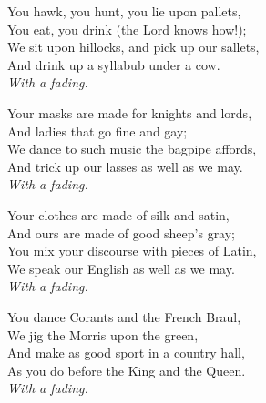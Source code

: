 \begin{dcverse}\footnotesize
\begin{patverse}
You hawk, you hunt, you lie upon pallets,\\
You eat, you drink (the Lord knows how!);\\
We sit upon hillocks, and pick up our sallets,\\
And drink up a syllabub under a cow.\\
\textit{With a fading.}
\end{patverse}

\begin{patverse}
Your masks are made for knights and lords,\\
And ladies that go fine and gay;\\
We dance to such music the bagpipe affords,\\
And trick up our lasses as well as we may.\\
\textit{With a fading.}
\end{patverse}

\begin{patverse}
Your clothes are made of silk and satin,\\
And ours are made of good sheep’s gray;\\
You mix your discourse with pieces of Latin,\\
We speak our English as well as we may.\\
\textit{With a fading.}
\end{patverse}

\begin{patverse}
You dance Corants and the French Braul,\\
We jig the Morris upon the green,\\
And make as good sport in a country hall,\\
As you do before the King and the Queen.\\
\textit{With a fading.}
\end{patverse}
\end{dcverse}

\vspace{-1.5\baselineskip}


\vspace{-0.5\baselineskip}

